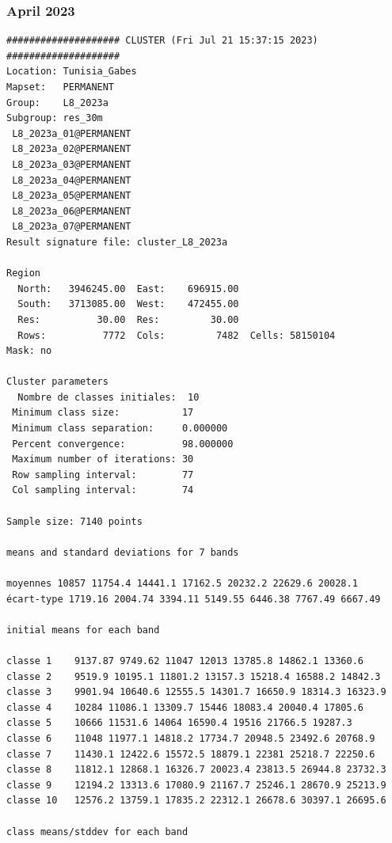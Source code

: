 \documentclass[land,article,submit,pdftex,moreauthors]{Definitions/mdpi}
\begin{document}
\subsubsection[\appendixname~\thesubsubsection]{April 2023}
\begin{scriptsize}
\begin{verbatim}
#################### CLUSTER (Fri Jul 21 15:37:15 2023) ####################
Location: Tunisia_Gabes
Mapset:   PERMANENT
Group:    L8_2023a
Subgroup: res_30m
 L8_2023a_01@PERMANENT
 L8_2023a_02@PERMANENT
 L8_2023a_03@PERMANENT
 L8_2023a_04@PERMANENT
 L8_2023a_05@PERMANENT
 L8_2023a_06@PERMANENT
 L8_2023a_07@PERMANENT
Result signature file: cluster_L8_2023a

Region
  North:   3946245.00  East:    696915.00
  South:   3713085.00  West:    472455.00
  Res:          30.00  Res:         30.00
  Rows:          7772  Cols:         7482  Cells: 58150104
Mask: no

Cluster parameters
  Nombre de classes initiales: 	10
 Minimum class size:           17
 Minimum class separation:     0.000000
 Percent convergence:          98.000000
 Maximum number of iterations: 30
 Row sampling interval:        77
 Col sampling interval:        74

Sample size: 7140 points

means and standard deviations for 7 bands

moyennes 10857 11754.4 14441.1 17162.5 20232.2 22629.6 20028.1
écart-type 1719.16 2004.74 3394.11 5149.55 6446.38 7767.49 6667.49

initial means for each band

classe 1    9137.87 9749.62 11047 12013 13785.8 14862.1 13360.6
classe 2    9519.9 10195.1 11801.2 13157.3 15218.4 16588.2 14842.3
classe 3    9901.94 10640.6 12555.5 14301.7 16650.9 18314.3 16323.9
classe 4    10284 11086.1 13309.7 15446 18083.4 20040.4 17805.6
classe 5    10666 11531.6 14064 16590.4 19516 21766.5 19287.3
classe 6    11048 11977.1 14818.2 17734.7 20948.5 23492.6 20768.9
classe 7    11430.1 12422.6 15572.5 18879.1 22381 25218.7 22250.6
classe 8    11812.1 12868.1 16326.7 20023.4 23813.5 26944.8 23732.3
classe 9    12194.2 13313.6 17080.9 21167.7 25246.1 28670.9 25213.9
classe 10   12576.2 13759.1 17835.2 22312.1 26678.6 30397.1 26695.6

class means/stddev for each band


\end{verbatim}
\end{scriptsize}
\end{document}

